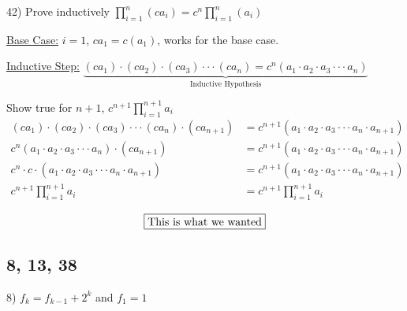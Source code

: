 \documentclass[11pt]{article}
\newcommand*{\mybox}[1]{\framebox{#1}}
\begin{document}
\begin{flushleft}
\hrulefill
\vspace{3mm}

42) Prove inductively $\displaystyle{\prod\limits_{i=1}^n(ca_i) = c^n\prod\limits_{i=1}^n(a_i)}$

\vspace{3mm}

\underline{Base Case:} $i=1$, $ca_1=c(a_1)$, works for the base case.

\vspace{3mm}

\underline{Inductive Step:} $\underbrace{(ca_1)\cdot (ca_2)\cdot (ca_3) \cdot \cdot \cdot (ca_n) = c^n(a_1 \cdot a_2 \cdot a_3 \cdot \cdot \cdot a_n)}\limits_{\text{Inductive Hypothesis}}$

Show true for $n+1$, $\displaystyle{c^{n+1}\prod\limits_{i=1}^{n+1}a_i}$
\begin{align*}
(ca_1)\cdot (ca_2)\cdot (ca_3) \cdot \cdot \cdot (ca_n) \cdot (ca_{n+1}) &= c^{n+1}(a_1 \cdot a_2 \cdot a_3 \cdot \cdot \cdot a_n\cdot a_{n+1})\\
c^n(a_1 \cdot a_2 \cdot a_3 \cdot \cdot \cdot a_n) \cdot (ca_{n+1}) &= c^{n+1}(a_1 \cdot a_2 \cdot a_3 \cdot \cdot \cdot a_n\cdot a_{n+1})\\
c^{n}\cdot c \cdot(a_1 \cdot a_2 \cdot a_3 \cdot \cdot \cdot a_n\cdot a_{n+1})&= c^{n+1}(a_1 \cdot a_2 \cdot a_3 \cdot \cdot \cdot a_n\cdot a_{n+1})\\
\displaystyle{c^{n+1}\prod\limits_{i=1}^{n+1}a_i} &= \displaystyle{c^{n+1}\prod\limits_{i=1}^{n+1}a_i}
\end{align*}

$$\text{\mybox{This is what we wanted}}$$






\hrulefill

\subsection{8, 13, 38}

\vspace{3mm}

8) $f_k = f_{k-1}+2^k$ and $f_1 = 1$


\end{flushleft}
\end{document}
